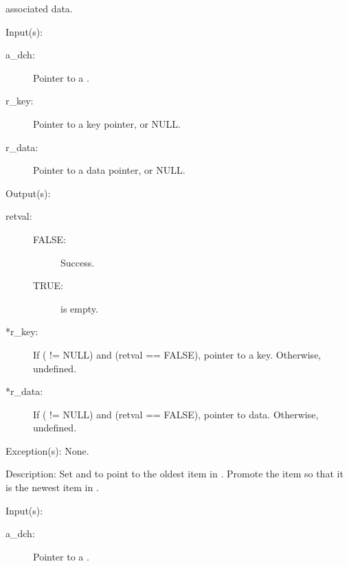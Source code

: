 \begin{capi}
\begin{capilist}
		associated data.
	\end{capilist}
\label{dch_get_iterate}
	\begin{capilist}
	\item[Input(s): ]
		\begin{description}\item[]
		\item[a\_dch: ]
			Pointer to a .
		\item[r\_key: ]
			Pointer to a key pointer, or NULL.
		\item[r\_data: ]
			Pointer to a data pointer, or NULL.
		\end{description}
	\item[Output(s): ]
		\begin{description}\item[]
		\item[retval: ]
			\begin{description}\item[]
			\item[FALSE: ]
				Success.
			\item[TRUE: ]
				 is empty.
			\end{description}
		\item[*r\_key: ]
			If ( != NULL) and (retval == FALSE),
			pointer to a key.  Otherwise, undefined.
		\item[*r\_data: ]
			If ( != NULL) and (retval == FALSE),
			pointer to data.  Otherwise, undefined.
		\end{description}
	\item[Exception(s): ] None.
	\item[Description: ]
		Set  and  to point to the oldest
		item in .  Promote the item so that it is the
		newest item in .
	\end{capilist}
\label{dch_remove_iterate}
	\begin{capilist}
	\item[Input(s): ]
		\begin{description}\item[]
		\item[a\_dch: ]
			Pointer to a \classname{dch}.

\end{description}
\end{capilist}
\end{capi}
